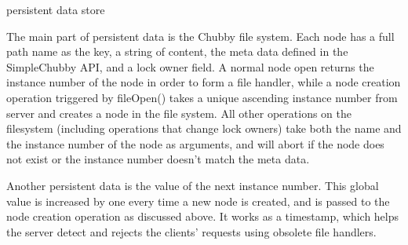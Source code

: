 persistent data store

The main part of persistent data is the Chubby file system. Each node has
a full path name as the key, a string of content, the meta data defined
in the SimpleChubby API, and a lock owner field. A normal node open returns
the instance number of the node in order to form a file handler, while
a node creation operation triggered by fileOpen() takes a unique ascending
instance number from server and creates a node in the file system. All other
operations on the filesystem (including operations that change lock owners)
take both the name and the instance number of the node as arguments, and will
abort if the node does not exist or the instance number doesn't match the
meta data.

Another persistent data is the value of the next instance number. This global
value is increased by one every time a new node is created, and is passed
to the node creation operation as discussed above. It works as a timestamp,
which helps the server detect and rejects the clients' requests using obsolete
file handlers.



